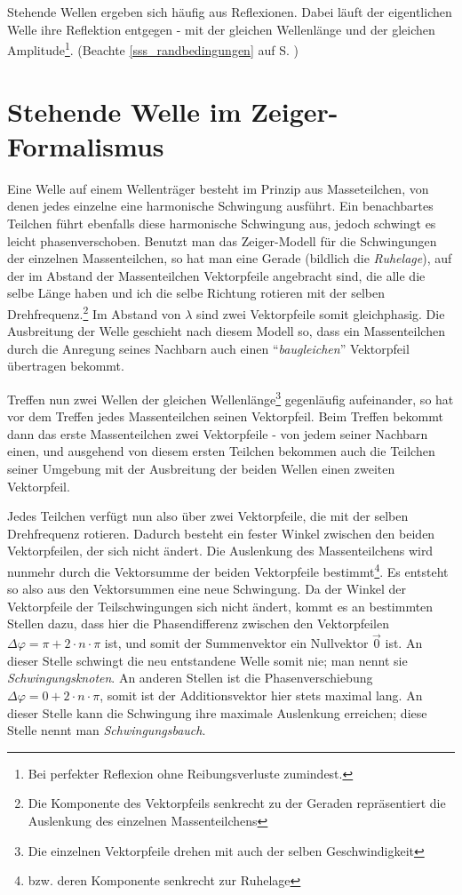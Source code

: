 Stehende Wellen ergeben sich häufig aus Reflexionen. Dabei läuft der eigentlichen Welle ihre Reflektion entgegen - mit der gleichen Wellenlänge und der gleichen Amplitude\footnote{Bei perfekter Reflexion ohne Reibungsverluste zumindest.}. (Beachte \ref{sss_randbedingungen} auf S. \pageref{sss_randbedingungen})





			\section{Stehende Welle im Zeiger-Formalismus}

Eine Welle auf einem Wellenträger besteht im Prinzip aus Masseteilchen, von denen jedes einzelne eine harmonische Schwingung ausführt. Ein benachbartes Teilchen führt ebenfalls diese harmonische Schwingung aus, jedoch schwingt es leicht phasenverschoben. Benutzt man das Zeiger-Modell für die Schwingungen der einzelnen Massenteilchen, so hat man eine Gerade (bildlich die \emph{Ruhelage}), auf der im Abstand der Massenteilchen Vektorpfeile angebracht sind, die alle die selbe Länge haben und ich die selbe Richtung rotieren mit der selben Drehfrequenz.\footnote{Die Komponente des Vektorpfeils senkrecht zu der Geraden repräsentiert die Auslenkung des einzelnen Massenteilchens} Im Abstand von \(\lambda\) sind zwei Vektorpfeile somit gleichphasig. Die Ausbreitung der Welle geschieht nach diesem Modell so, dass ein Massenteilchen durch die Anregung seines Nachbarn auch einen "`\textit{baugleichen}"' Vektorpfeil übertragen bekommt.

Treffen nun zwei Wellen der gleichen Wellenlänge\footnote{Die einzelnen Vektorpfeile drehen mit auch der selben Geschwindigkeit} gegenläufig aufeinander, so hat vor dem Treffen jedes Massenteilchen seinen Vektorpfeil. Beim Treffen bekommt dann das erste Massenteilchen zwei Vektorpfeile - von jedem seiner Nachbarn einen, und ausgehend von diesem ersten Teilchen bekommen auch die Teilchen seiner Umgebung mit der Ausbreitung der beiden Wellen einen zweiten Vektorpfeil.

Jedes Teilchen verfügt nun also über zwei Vektorpfeile, die mit der selben Drehfrequenz rotieren. Dadurch besteht ein fester Winkel zwischen den beiden Vektorpfeilen, der sich nicht ändert. Die Auslenkung des Massenteilchens wird nunmehr durch die Vektorsumme der beiden Vektorpfeile bestimmt\footnote{bzw. deren Komponente senkrecht zur Ruhelage}. Es entsteht so also aus den Vektorsummen eine neue Schwingung. Da der Winkel der Vektorpfeile der Teilschwingungen sich nicht ändert, kommt es an bestimmten Stellen dazu, dass hier die Phasendifferenz zwischen den Vektorpfeilen \(\Delta\varphi = \pi + 2 \cdot n \cdot \pi\) ist, und somit der Summenvektor ein Nullvektor \(\vec{0}\) ist. An dieser Stelle schwingt die neu entstandene Welle somit nie; man nennt sie \textit{Schwingungsknoten}. An anderen Stellen ist die Phasenverschiebung \(\Delta\varphi = 0 + 2 \cdot n \cdot \pi\), somit ist der Additionsvektor hier stets maximal lang. An dieser Stelle kann die Schwingung ihre maximale Auslenkung erreichen; diese Stelle nennt man \textit{Schwingungsbauch}.




